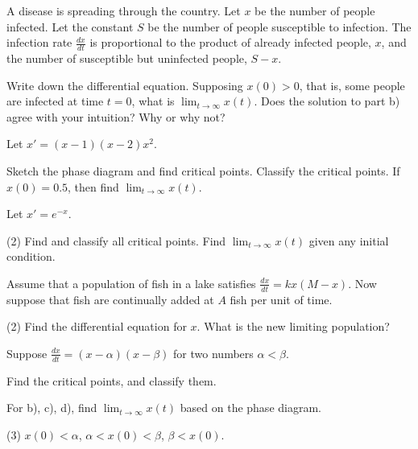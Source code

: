 \begin{exercise}
A disease is spreading through the country.  Let $x$ be the number of people
infected.  Let the constant $S$ be the number of people susceptible to
infection.  The infection rate $\frac{dx}{dt}$ is proportional to the product
of already infected people, $x$, and the number of susceptible but
uninfected people, $S-x$.
\begin{tasks}
\task Write down the differential equation.
\task Supposing $x(0) > 0$, that is, some people are infected at time $t=0$,
what is
$\displaystyle \lim_{t\to\infty} x(t)$.
\task Does the solution to part b) agree with your intuition?  Why or why not?
\end{tasks}
\end{exercise}


\setcounter{exercise}{100}

\begin{exercise}
\pagebreak[2]
Let $x'=(x-1)(x-2)x^2$.
\begin{tasks}
\task Sketch the phase diagram and find critical
points.
\task Classify the critical points.
\task If $x(0)=0.5$, then find $\displaystyle \lim_{t\to\infty} x(t)$.
\end{tasks}
\end{exercise}

\begin{exercise}
Let $x'=e^{-x}$.
\begin{tasks}(2)
\task Find and classify all critical points.
\task Find $\displaystyle \lim_{t\to\infty} x(t)$ given any 
initial condition.
\end{tasks}
\end{exercise}

\begin{exercise}
Assume that a population of fish in a lake satisfies
$\frac{dx}{dt} = kx(M-x)$.  Now suppose that fish are continually added
at $A$ fish per unit of time.
\begin{tasks}(2)
\task Find the differential equation for $x$.
\task What is the new limiting population?
\end{tasks}
\end{exercise}

\begin{exercise}
Suppose $\frac{dx}{dt} = (x-\alpha)(x-\beta)$ for two numbers $\alpha <
\beta$.
\begin{tasks}
\task Find the critical points, and classify them.
\end{tasks}
For b), c), d), find $\displaystyle \lim_{t\to\infty} x(t)$ based on
the phase diagram.
\begin{tasks}[resume](3)
\task $x(0) < \alpha$,
\task $\alpha < x(0) < \beta$,
\task $\beta < x(0)$.
\end{tasks}
\end{exercise}

